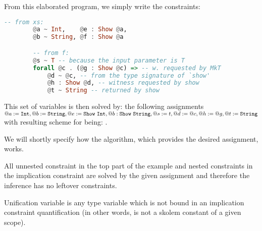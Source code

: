 \begin{ex}[Existentials]
    From this elaborated program, we simply write the constraints:

    \begin{lstlisting}[language=Haskell]
        -- from xs:
        @a ~ Int,    @e : Show @a,
        @b ~ String, @f : Show @a

        -- from f:
        @s ~ T -- because the input parameter is T
        forall @c . (@g : Show @c) => -- w. requested by MkT
            @d ~ @c, -- from the type signature of `show'
            @h : Show @d, -- witness requested by show
            @t ~ String -- returned by show
    \end{lstlisting}

    This set of variables is then solved by: the following assignments $@a := \mathtt{Int}, @b := \mathtt{String}, @e := \mathtt{Show}\ \mathtt{Int}, @b : \mathtt{Show}\ \mathtt{String}, @s := t, @d := @c, @h := @g, @t := \mathtt{String}$ with resulting scheme for  being: .

    We will shortly specify how the algorithm, which provides the desired assignment, works.

    All unnested constraint in the top part of the example and nested constraints in the implication constraint are solved by the given assignment and therefore the inference has no leftover constraints.
\end{ex}

\begin{defn}
    Unification variable is any type variable which is not bound in an implication constraint quantification (in other words, is not a skolem constant of a given scope).
\end{defn}

